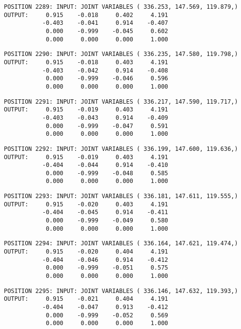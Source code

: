 \begin{verbatim}
POSITION 2289: INPUT: JOINT VARIABLES ( 336.253, 147.569, 119.879,)
OUTPUT:     0.915    -0.018     0.402     4.191
           -0.403    -0.041     0.914    -0.407
            0.000    -0.999    -0.045     0.602
            0.000     0.000     0.000     1.000
\end{verbatim} \pagebreak[1]\begin{verbatim}
POSITION 2290: INPUT: JOINT VARIABLES ( 336.235, 147.580, 119.798,)
OUTPUT:     0.915    -0.018     0.403     4.191
           -0.403    -0.042     0.914    -0.408
            0.000    -0.999    -0.046     0.596
            0.000     0.000     0.000     1.000
\end{verbatim} \pagebreak[1]\begin{verbatim}
POSITION 2291: INPUT: JOINT VARIABLES ( 336.217, 147.590, 119.717,)
OUTPUT:     0.915    -0.019     0.403     4.191
           -0.403    -0.043     0.914    -0.409
            0.000    -0.999    -0.047     0.591
            0.000     0.000     0.000     1.000
\end{verbatim} \pagebreak[1]\begin{verbatim}
POSITION 2292: INPUT: JOINT VARIABLES ( 336.199, 147.600, 119.636,)
OUTPUT:     0.915    -0.019     0.403     4.191
           -0.404    -0.044     0.914    -0.410
            0.000    -0.999    -0.048     0.585
            0.000     0.000     0.000     1.000
\end{verbatim} \pagebreak[1]\begin{verbatim}
POSITION 2293: INPUT: JOINT VARIABLES ( 336.181, 147.611, 119.555,)
OUTPUT:     0.915    -0.020     0.403     4.191
           -0.404    -0.045     0.914    -0.411
            0.000    -0.999    -0.049     0.580
            0.000     0.000     0.000     1.000
\end{verbatim} \pagebreak[1]\begin{verbatim}
POSITION 2294: INPUT: JOINT VARIABLES ( 336.164, 147.621, 119.474,)
OUTPUT:     0.915    -0.020     0.404     4.191
           -0.404    -0.046     0.914    -0.412
            0.000    -0.999    -0.051     0.575
            0.000     0.000     0.000     1.000
\end{verbatim} \pagebreak[1]\begin{verbatim}
POSITION 2295: INPUT: JOINT VARIABLES ( 336.146, 147.632, 119.393,)
OUTPUT:     0.915    -0.021     0.404     4.191
           -0.404    -0.047     0.913    -0.412
            0.000    -0.999    -0.052     0.569
            0.000     0.000     0.000     1.000
\end{verbatim} \pagebreak[1]\begin{verbatim}

\end{verbatim}
